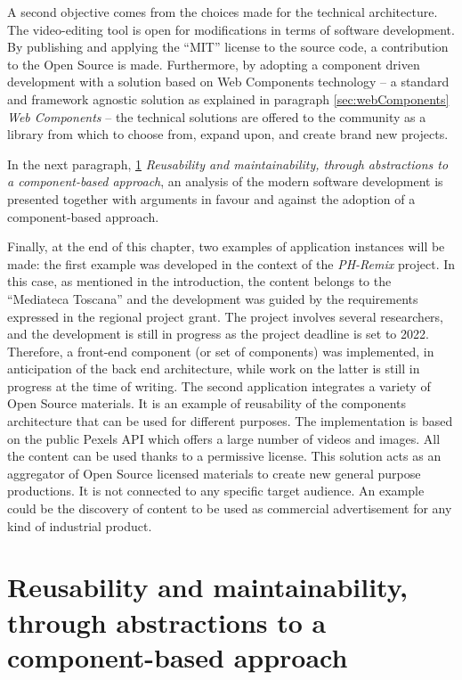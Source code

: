 A second objective comes from the choices made for the technical architecture. The video-editing tool is open for modifications in terms of software development. By publishing and applying the “MIT” license to the source code, a contribution to the Open Source is made. Furthermore, by adopting a component driven development with a solution based on Web Components technology – a standard and framework agnostic solution as explained in paragraph \ref{sec:webComponents} \emph{Web Components} – the technical solutions are offered to the community as a library from which to choose from, expand upon, and create brand new projects.

In the next paragraph, \ref{sec:reuseAndMaintainability} \emph{Reusability and maintainability, through abstractions to a component-based approach}, an analysis of the modern software development is presented together with arguments in favour and against the adoption of a component-based approach.

Finally, at the end of this chapter, two examples of application instances will be made: the first example was developed in the context of the \emph{PH-Remix} project. In this case, as mentioned in the introduction, the content belongs to the “Mediateca Toscana” and the development was guided by the requirements expressed in the regional project grant. The project involves several researchers, and the development is still in progress as the project deadline is set to 2022. Therefore, a front-end component (or set of components) was implemented, in anticipation of the back end architecture, while work on the latter is still in progress at the time of writing.
The second application integrates a variety of Open Source materials. It is an example of reusability of the components architecture that can be used for different purposes. The implementation is based on the public Pexels API which offers a large number of videos and images. All the content can be used thanks to a permissive license. This solution acts as an aggregator of Open Source licensed materials to create new general purpose productions. It is not connected to any specific target audience. An example could be the discovery of content to be used as commercial advertisement for any kind of industrial product.

\section{Reusability and maintainability, through abstractions to a component-based approach}
\label{sec:reuseAndMaintainability}

